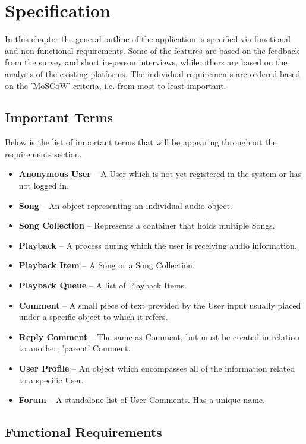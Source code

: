 \chapter{Specification}
In this chapter the general outline of the application is specified via functional and non-functional requirements.
Some of the features are based on the feedback from the survey and short in-person interviews,
while others are based on the analysis of the existing platforms.
The individual requirements are ordered based on the 'MoSCoW' criteria, i.e. from most to least important.

\section{Important Terms}

Below is the list of important terms that will be appearing throughout the requirements section.

\begin{itemize}
    \item \textbf{Anonymous User} – A User which is not yet registered in the system or has not logged in.
    \item \textbf{Song} – An object representing an individual audio object.
    \item \textbf{Song Collection} – Represents a container that holds multiple Songs.
    \item \textbf{Playback} – A process during which the user is receiving audio information.
    \item \textbf{Playback Item} – A Song or a Song Collection.
    \item \textbf{Playback Queue} – A list of Playback Items.
    \item \textbf{Comment} – A small piece of text provided by the User input usually placed under a specific object to which it refers.
    \item \textbf{Reply Comment} – The same as Comment, but must be created in relation to another, 'parent' Comment.
    \item \textbf{User Profile} – An object which encompasses all of the information related to a specific User.
    \item \textbf{Forum} – A standalone list of User Comments. Has a unique name.
\end{itemize}


\section{Functional Requirements}

